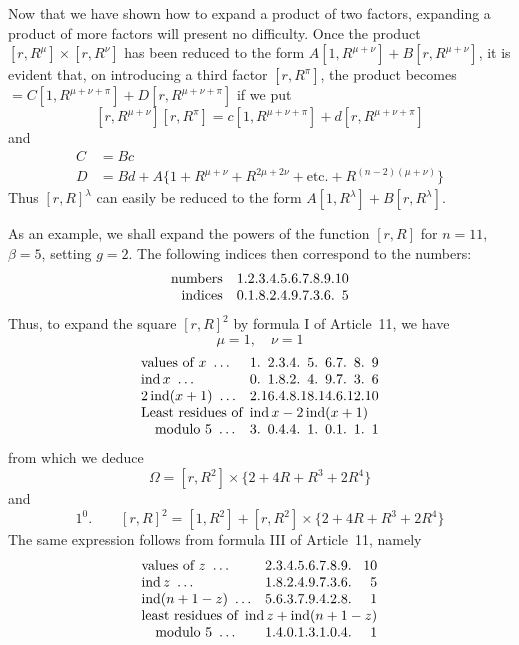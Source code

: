\clearpage
\hypertarget{native-264-pure13}{}\label{native-264-pure13}
Now that we have shown how to expand a product of two factors, expanding a product of more factors will present no difficulty. Once the product $[r,R^\mu]\times[r,R^\nu]$ has been reduced to the form $A[1,R^{\mu+\nu}]+B[r,R^{\mu+\nu}]$, it is evident that, on introducing a third factor $[r,R^\pi]$, the product becomes $=C[1,R^{\mu+\nu+\pi}]+D[r,R^{\mu+\nu+\pi}]$ if we put
\[
[r,R^{\mu+\nu}][r,R^\pi]=c[1,R^{\mu+\nu+\pi}]+d[r,R^{\mu+\nu+\pi}]
\]
and
\[
\begin{aligned}
C&=Bc\\
D&=Bd+A\{1+R^{\mu+\nu}+R^{2\mu+2\nu}+\text{etc.}+R^{(n-2)(\mu+\nu)}\}
\end{aligned}
\]
Thus $[r,R]^\lambda$ can easily be reduced to the form $A[1,R^\lambda]+B[r,R^\lambda]$.

As an example, we shall expand the powers of the function $[r,R]$ for $n=11$, $\beta=5$, setting $g=2$. The following indices then correspond to the numbers:
\[
\begin{array}{r@{\quad}r@{\pdot}r@{\pdot}r@{\pdot}r@{\pdot}r@{\pdot}r@{\pdot}r@{\pdot}r@{\pdot}r@{\pdot}r}
\text{numbers}&1&2&3&4&5&6&7&8&9&10\\
\text{indices}&0&1&8&2&4&9&7&3&6&5
\end{array}
\]
Thus, to expand the square $[r,R]^2$ by formula I of Article~11, we have
\[
\mu=1,\quad\nu=1
\]
\[
\begin{array}{l@{\quad}r@{\pdot}r@{\pdot}r@{\pdot}r@{\pdot}r@{\pdot}r@{\pdot}r@{\pdot}r@{\pdot}r}
\text{values of }x\ \ldots&1&2&3&4&5&6&7&8&9\\
\operatorname{ind}x\ \ldots&0&1&8&2&4&9&7&3&6\\
2\operatorname{ind}(x+1)\ \ldots&2&16&4&8&18&14&6&12&10\\
\multicolumn{10}{l}{\text{Least residues of }\operatorname{ind}x-2\operatorname{ind}(x+1)}\\
\quad\text{modulo }5\ \ldots&3&0&4&4&1&0&1&1&1
\end{array}
\]
from which we deduce
\[
\Omega=[r,R^2]\times\{2+4R+R^3+2R^4\}
\]
and
\[
1^0.\qquad[r,R]^2=[1,R^2]+[r,R^2]\times\{2+4R+R^3+2R^4\}
\]
The same expression follows from formula III of Article~11, namely
\[
\begin{array}{l@{\quad}r@{\pdot}r@{\pdot}r@{\pdot}r@{\pdot}r@{\pdot}r@{\pdot}r@{\pdot}r@{\pdot}r}
\text{values of }z\ \ldots&2&3&4&5&6&7&8&9&10\\
\operatorname{ind}z\ \ldots&1&8&2&4&9&7&3&6&5\\
\operatorname{ind}(n+1-z)\ \ldots&5&6&3&7&9&4&2&8&1\\
\multicolumn{10}{l}{\text{least residues of }\operatorname{ind}z+\operatorname{ind}(n+1-z)}\\
\quad\text{modulo }5\ \ldots&1&4&0&1&3&1&0&4&1
\end{array}
\]

